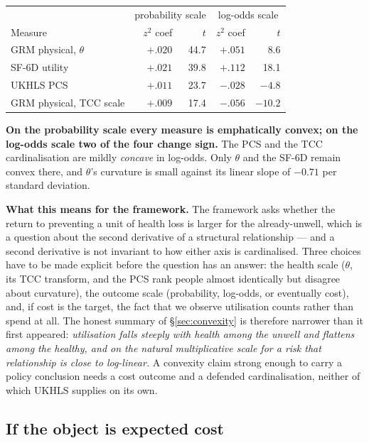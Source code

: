 \documentclass[11pt]{article}
\begin{document}
\begin{center}\small
\begin{tabular}{lrrrr}
\toprule
 & \multicolumn{2}{c}{probability scale} & \multicolumn{2}{c}{log-odds scale} \\
Measure & $z^2$ coef & $t$ & $z^2$ coef & $t$ \\
\midrule
GRM physical, $\theta$ & $+.020$ & 44.7 & $+.051$ & 8.6 \\
SF-6D utility & $+.021$ & 39.8 & $+.112$ & 18.1 \\
UKHLS PCS & $+.011$ & 23.7 & $\mathbf{-.028}$ & $-4.8$ \\
GRM physical, TCC scale & $+.009$ & 17.4 & $\mathbf{-.056}$ & $-10.2$ \\
\bottomrule
\end{tabular}
\end{center}

\textbf{On the probability scale every measure is emphatically convex; on the
log-odds scale two of the four change sign.} The PCS and the TCC
cardinalisation are mildly \emph{concave} in log-odds. Only $\theta$ and the
SF-6D remain convex there, and $\theta$'s curvature is small against its
linear slope of $-0.71$ per standard deviation.

\textbf{What this means for the framework.} The framework asks whether the
return to preventing a unit of health loss is larger for the already-unwell,
which is a question about the second derivative of a structural relationship
--- and a second derivative is not invariant to how either axis is
cardinalised. Three choices have to be made explicit before the question has
an answer: the health scale ($\theta$, its TCC transform, and the PCS rank
people almost identically but disagree about curvature), the outcome scale
(probability, log-odds, or eventually cost), and, if cost is the target, the
fact that we observe utilisation counts rather than spend at all. The honest
summary of \S\ref{sec:convexity} is therefore narrower than it first
appeared: \emph{utilisation falls steeply with health among the unwell and
flattens among the healthy, and on the natural multiplicative scale for a
risk that relationship is close to log-linear.} A convexity claim strong
enough to carry a policy conclusion needs a cost outcome and a defended
cardinalisation, neither of which UKHLS supplies on its own.

\subsection{If the object is expected cost}
\label{sec:expcost}
\end{document}
